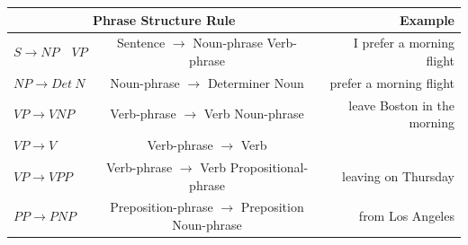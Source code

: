 \documentclass[11pt]{article}
\begin{document}
\begin{tabular}{l c r}
    \hline
    \multicolumn{2}{c}{\textbf{Phrase Structure Rule}} & \textbf{Example} \\
    \hline
    $S \rightarrow NP \quad VP$ & Sentence $\rightarrow$ Noun-phrase Verb-phrase & I prefer a morning flight \\
    $NP \rightarrow Det\ N$ & Noun-phrase $\rightarrow$ Determiner Noun & prefer a morning flight\\
    $VP \rightarrow V NP$ & Verb-phrase $\rightarrow$ Verb Noun-phrase & leave Boston in the morning\\
    $VP \rightarrow V$ & Verb-phrase $\rightarrow$ Verb & \\
    $VP \rightarrow V PP$ & Verb-phrase $\rightarrow$ Verb Propositional-phrase & leaving on Thursday\\
    $PP \rightarrow P NP$ & Preposition-phrase $\rightarrow$ Preposition Noun-phrase & from Los Angeles\\
\end{tabular}
\end{document}
